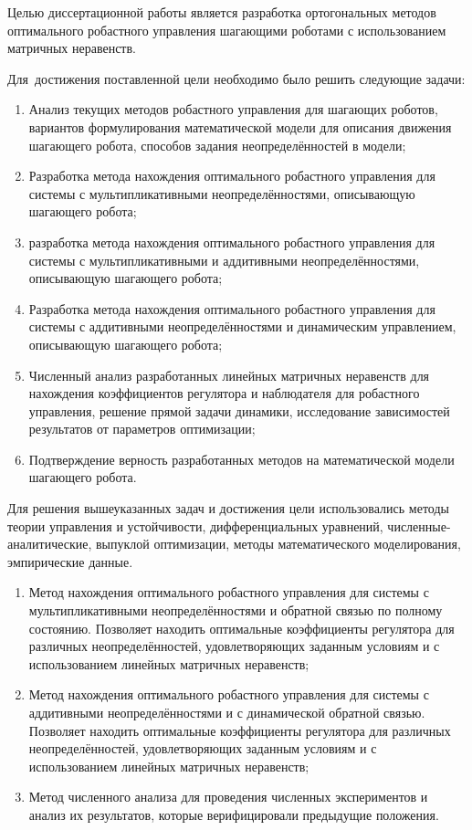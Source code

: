 {\aimtasks} 

Целью диссертационной работы является разработка ортогональных методов оптимального робастного управления шагающими роботами с использованием матричных неравенств.

Для~достижения поставленной цели необходимо было решить следующие задачи:
\begin{enumerate}[beginpenalty=10000] %
	\item Анализ текущих методов робастного управления для шагающих роботов, вариантов формулирования математической модели для описания движения шагающего робота, способов задания неопределённостей в модели;
	\item Разработка метода нахождения оптимального робастного управления для системы с мультипликативными неопределённостями, описывающую шагающего робота;
	\item разработка метода нахождения оптимального робастного управления для системы с мультипликативными и аддитивными неопределённостями, описывающую шагающего робота;
	\item Разработка метода нахождения оптимального робастного управления для системы с аддитивными неопределённостями и динамическим управлением, описывающую шагающего робота;
	\item Численный анализ разработанных линейных матричных неравенств для нахождения коэффициентов регулятора и наблюдателя для робастного управления, решение прямой задачи динамики, исследование зависимостей результатов от параметров оптимизации;
	\item Подтверждение верность разработанных методов на математической модели шагающего робота.
\end{enumerate}

{\methods} 

Для решения вышеуказанных задач и достижения цели использовались методы теории управления и устойчивости, дифференциальных уравнений, численные-аналитические, выпуклой оптимизации, методы математического моделирования, эмпирические данные.

{}

\begin{enumerate}[beginpenalty=10000] %
	\item Метод нахождения оптимального робастного управления для системы с мультипликативными неопределённостями и обратной связью по полному состоянию. Позволяет находить оптимальные коэффициенты регулятора для различных неопределённостей, удовлетворяющих заданным условиям и с использованием линейных матричных неравенств; 
	\item Метод нахождения оптимального робастного управления для системы с аддитивными неопределённостями и с динамической обратной связью. Позволяет находить оптимальные коэффициенты регулятора для различных неопределённостей, удовлетворяющих заданным условиям и с использованием линейных матричных неравенств; 
	\item Метод численного анализа для проведения численных экспериментов и анализ их результатов, которые верифицировали предыдущие положения.
\end{enumerate}

